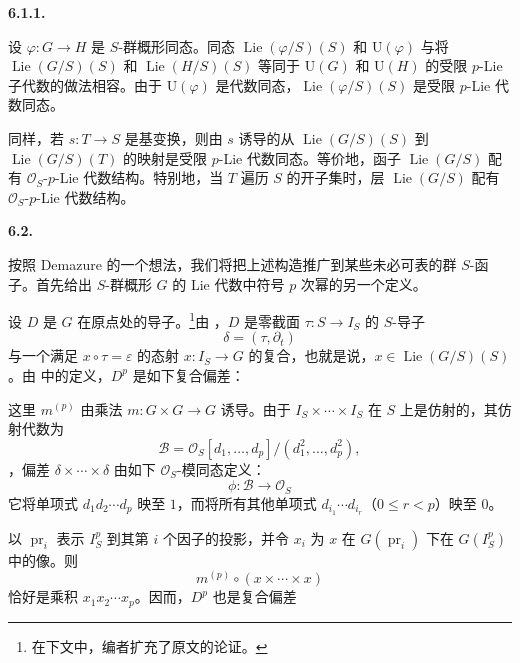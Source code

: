 \medskip
\noindent\textbf{6.1.1.}
\label{sga3:VIIA:6.1.1}

设 \(\varphi:G\to H\) 是 \(S\)-群概形同态。同态 \(\operatorname{Lie}(\varphi/S)(S)\) 和 \(\mathrm U(\varphi)\) 与将 \(\operatorname{Lie}(G/S)(S)\) 和 \(\operatorname{Lie}(H/S)(S)\) 等同于 \(\mathrm U(G)\) 和 \(\mathrm U(H)\) 的受限 \(p\)-Lie 子代数的做法相容。由于 \(\mathrm U(\varphi)\) 是代数同态，\(\operatorname{Lie}(\varphi/S)(S)\) 是受限 \(p\)-Lie 代数同态。

同样，若 \(s:T\to S\) 是基变换，则由 \(s\) 诱导的从 \(\operatorname{Lie}(G/S)(S)\) 到 \(\operatorname{Lie}(G/S)(T)\) 的映射是受限 \(p\)-Lie 代数同态。等价地，函子 \(\operatorname{Lie}(G/S)\) 配有 \(\mathcal O_S\)-\(p\)-Lie 代数结构。特别地，当 \(T\) 遍历 \(S\) 的开子集时，层 \(\operatorname{Lie}(G/S)\) 配有 \(\mathcal O_S\)-\(p\)-Lie 代数结构。

\medskip
\noindent\textbf{6.2.}
\label{sga3:VIIA:6.2}

按照 Demazure 的一个想法，我们将把上述构造推广到某些未必可表的群 \(S\)-函子。首先给出 \(S\)-群概形 \(G\) 的 Lie 代数中符号 \(p\) 次幂的另一个定义。

设 \(D\) 是 \(G\) 在原点处的导子。\footnote{在下文中，编者扩充了原文的论证。}由 ，\(D\) 是零截面 \(\tau:S\to I_S\) 的 \(S\)-导子
\[
  \delta=(\tau,\partial_t)
\]
与一个满足 \(x\circ\tau=\varepsilon\) 的态射 \(x:I_S\to G\) 的复合，也就是说，\(x\in\operatorname{Lie}(G/S)(S)\)。由  中的定义，\(D^p\) 是如下复合偏差：
\begin{center}
  \label{sga3:VIIA:6.2-demazure-pfold-composite}
  
\end{center}
这里 \(m^{(p)}\) 由乘法 \(m:G\times G\to G\) 诱导。由于 \(I_S\times\cdots\times I_S\) 在 \(S\) 上是仿射的，其仿射代数为
\[
  \mathcal B
  =
  \mathcal O_S[d_1,\ldots,d_p]/
  (d_1^2,\ldots,d_p^2),
\]
，偏差 \(\delta\times\cdots\times\delta\) 由如下 \(\mathcal O_S\)-模同态定义：
\[
  \phi:\mathcal B\longrightarrow\mathcal O_S
\]
它将单项式 \(d_1d_2\cdots d_p\) 映至 \(1\)，而将所有其他单项式 \(d_{i_1}\cdots d_{i_r}\)（\(0\le r<p\)）映至 \(0\)。

以 \(\operatorname{pr}_i\) 表示 \(I_S^p\) 到其第 \(i\) 个因子的投影，并令 \(x_i\) 为 \(x\) 在 \(G(\operatorname{pr}_i)\) 下在 \(G(I_S^p)\) 中的像。则
\[
  m^{(p)}\circ(x\times\cdots\times x)
\]
恰好是乘积 \(x_1x_2\cdots x_p\)。因而，\(D^p\) 也是复合偏差
\begin{center}
  \label{sga3:VIIA:6.2-demazure-product-composite}
  
\end{center}


